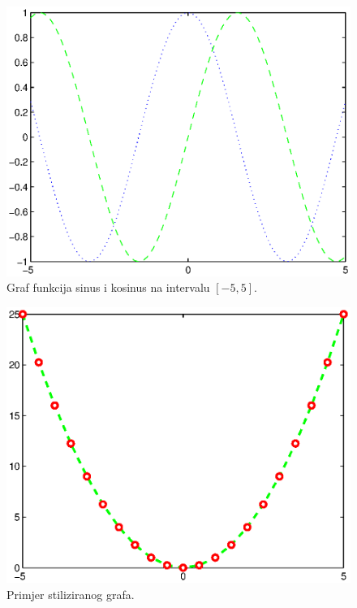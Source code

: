 \documentclass[a4paper, 10pt]{article}
\begin{document}
\begin{figure}[!htb]
\centering
\includegraphics[width=0.95\linewidth]{slike/plot_sin_cos_1.eps}
\caption{Graf funkcija sinus i kosinus na intervalu $[-5, 5]$.}
\label{fig:plot_sin_cos_1}
\end{figure}

\begin{figure}[!htb]
\centering
\includegraphics[width=0.95\linewidth]{slike/plot_stil.eps}
\caption{Primjer stiliziranog grafa.}
\label{fig:plot_stil}
\end{figure}
\end{document}
